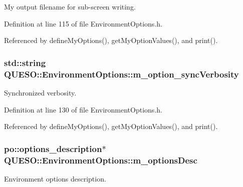 My output filename for sub-\/screen writing. 



Definition at line 115 of file Environment\-Options.\-h.



Referenced by define\-My\-Options(), get\-My\-Option\-Values(), and print().

\hypertarget{class_q_u_e_s_o_1_1_environment_options_a009eab8a08fe215cd9a6efe81010037d}{
\subsubsection[{m\-\_\-option\-\_\-sync\-Verbosity}]{\setlength{\rightskip}{0pt plus 5cm}std\-::string Q\-U\-E\-S\-O\-::\-Environment\-Options\-::m\-\_\-option\-\_\-sync\-Verbosity\hspace{0.3cm}{\ttfamily [private]}}}\label{class_q_u_e_s_o_1_1_environment_options_a009eab8a08fe215cd9a6efe81010037d}


Synchronized verbosity. 



Definition at line 130 of file Environment\-Options.\-h.



Referenced by define\-My\-Options(), get\-My\-Option\-Values(), and print().

\hypertarget{class_q_u_e_s_o_1_1_environment_options_aa1089e3d1ddc5a9c90fe14c96d668b16}{
\subsubsection[{m\-\_\-options\-Desc}]{\setlength{\rightskip}{0pt plus 5cm}po\-::options\-\_\-description$\ast$ Q\-U\-E\-S\-O\-::\-Environment\-Options\-::m\-\_\-options\-Desc\hspace{0.3cm}{\ttfamily [private]}}}\label{class_q_u_e_s_o_1_1_environment_options_aa1089e3d1ddc5a9c90fe14c96d668b16}


Environment options description. 

